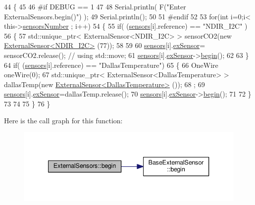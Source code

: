 \begin{DoxyCode}
44 \{
45 
46 \textcolor{preprocessor}{#if DEBUG == 1}
47 
48     Serial.println( F(\textcolor{stringliteral}{"Enter ExternalSensors.begin()"}) );
49     Serial.println();
50 
51 \textcolor{preprocessor}{#endif }
52 
53     \textcolor{keywordflow}{for}(\textcolor{keywordtype}{int} i=0;i< this->\hyperlink{classExternalSensors_a58e4fbf9adeae787d92be5fa33043b5d}{sensorsNumber} ; i++)
54     \{
55         \textcolor{keywordflow}{if}( (\hyperlink{classExternalSensors_a284233f884fcf00154a44740cf1d9e1e}{sensors}[i].reference) == \textcolor{stringliteral}{"NDIR\_I2C"} )
56         \{   
57             std::unique\_ptr< ExternalSensor<NDIR\_I2C> > sensorCO2(\textcolor{keyword}{new} 
      \hyperlink{classExternalSensor_3_01NDIR__I2C_01_4}{ExternalSensor<NDIR\_I2C>} (77));
58 
59 
60             \hyperlink{classExternalSensors_a284233f884fcf00154a44740cf1d9e1e}{sensors}[i].\hyperlink{structExternalSensors_1_1sensor_a9bca150fd468b8d0e090e6d72c5c2b48}{exSensor}= sensorCO2.release();                       \textcolor{comment}{// using
       std::move;}
61             \hyperlink{classExternalSensors_a284233f884fcf00154a44740cf1d9e1e}{sensors}[i].\hyperlink{structExternalSensors_1_1sensor_a9bca150fd468b8d0e090e6d72c5c2b48}{exSensor}->\hyperlink{classBaseExternalSensor_a87d132803d4f4fdd4e66332809f0c9a0}{begin}();
62 
63         \}
64         \textcolor{keywordflow}{if}( (\hyperlink{classExternalSensors_a284233f884fcf00154a44740cf1d9e1e}{sensors}[i].reference) == \textcolor{stringliteral}{"DallasTemperature"})
65         \{
66             OneWire oneWire(0);
67             std::unique\_ptr< ExternalSensor<DallasTemperature> > dallasTemp(\textcolor{keyword}{new} 
      \hyperlink{classExternalSensor_3_01DallasTemperature_01_4}{ExternalSensor<DallasTemperature>} ());
68              ;
69             \hyperlink{classExternalSensors_a284233f884fcf00154a44740cf1d9e1e}{sensors}[i].\hyperlink{structExternalSensors_1_1sensor_a9bca150fd468b8d0e090e6d72c5c2b48}{exSensor}=dallasTemp.release();
70             \hyperlink{classExternalSensors_a284233f884fcf00154a44740cf1d9e1e}{sensors}[i].\hyperlink{structExternalSensors_1_1sensor_a9bca150fd468b8d0e090e6d72c5c2b48}{exSensor}->\hyperlink{classBaseExternalSensor_a87d132803d4f4fdd4e66332809f0c9a0}{begin}();
71             
72         \}
73         
74         
75     \}
76 \}
\end{DoxyCode}
Here is the call graph for this function\+:\nopagebreak
\begin{figure}[H]
\begin{center}
\leavevmode
\includegraphics[width=340pt]{classExternalSensors_a58ede0d786a86417254708870f04a21e_cgraph}
\end{center}
\end{figure}
